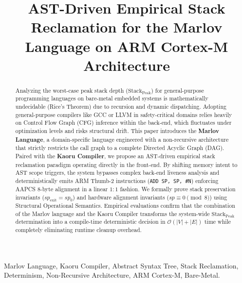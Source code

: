 \documentclass[conference]{IEEEtran}
\begin{document}
\title{AST-Driven Empirical Stack Reclamation for the Marlov Language on ARM Cortex-M Architecture}

\author{
}

\maketitle

\begin{abstract}
Analyzing the worst-case peak stack depth ($\mathrm{Stack}_{\mathrm{Peak}}$) for general-purpose programming languages on bare-metal embedded systems is mathematically undecidable (Rice's Theorem) due to recursion and dynamic dispatching. Adopting general-purpose compilers like GCC or LLVM in safety-critical domains relies heavily on Control Flow Graph (CFG) inference within the back-end, which fluctuates under optimization levels and risks structural drift. This paper introduces the \textbf{Marlov Language}, a domain-specific language engineered with a non-recursive architecture that strictly restricts the call graph to a complete Directed Acyclic Graph (DAG). Paired with the \textbf{Kaoru Compiler}, we propose an AST-driven empirical stack reclamation paradigm operating directly in the front-end. By shifting memory intent to AST scope triggers, the system bypasses complex back-end liveness analysis and deterministically emits ARM Thumb-2 instructions (\texttt{ADD SP, SP, \#N}) enforcing AAPCS 8-byte alignment in a linear $1:1$ fashion. We formally prove stack preservation invariants ($sp_{\text{exit}} = sp_0$) and hardware alignment invariants ($sp \equiv 0 \pmod 8$) using Structural Operational Semantics. Empirical evaluations confirm that the combination of the Marlov language and the Kaoru Compiler transforms the system-wide $\mathrm{Stack}_{\mathrm{Peak}}$ determination into a compile-time deterministic decision in $\mathcal{O}(|V| + |E|)$ time while completely eliminating runtime cleanup overhead.
\end{abstract}

\begin{IEEEkeywords}
Marlov Language, Kaoru Compiler, Abstract Syntax Tree, Stack Reclamation, Determinism, Non-Recursive Architecture, ARM Cortex-M, Bare-Metal.
\end{IEEEkeywords}
\end{document}
